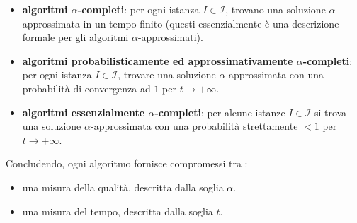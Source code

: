 \documentclass{article}
\begin{document}
\begin{itemize}
    \item \textbf{algoritmi $\alpha$-completi}: per ogni istanza $I\in\mathcal{I}$, trovano una soluzione $\alpha$-approssimata
          in un tempo finito (questi essenzialmente è una descrizione formale per gli algoritmi $\alpha$-approssimati).

    \item \textbf{algoritmi probabilisticamente ed approssimativamente $\alpha$-completi}: per ogni istanza $I\in\mathcal{I}$,
          trovare una soluzione $\alpha$-approssimata con una probabilità di convergenza ad $1$ per $t\rightarrow+\infty$.
    \item \textbf{algoritmi essenzialmente $\alpha$-completi}: per alcune istanze $I\in\mathcal{I}$ si trova
          una soluzione $\alpha$-approssimata con una probabilità strettamente $<1$ per $t\rightarrow +\infty$.
\end{itemize}
Concludendo, ogni algoritmo fornisce compromessi tra :
\begin{itemize}
    \item una misura della qualità, descritta dalla soglia $\alpha$.
    \item una misura del tempo, descritta dalla soglia $t$.
\end{itemize}
\end{document}
